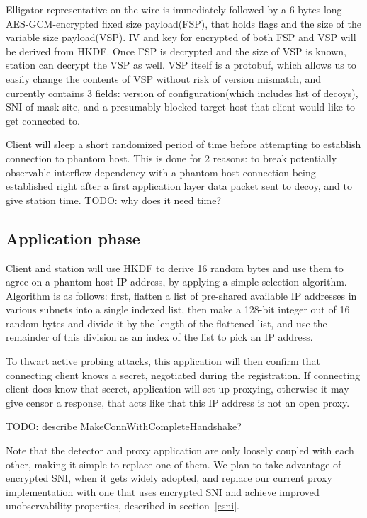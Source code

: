 \documentclass[sigconf,anonymous]{acmart}
\begin{document}
Elligator representative on the wire is immediately followed by a 6 bytes long AES-GCM-encrypted
fixed size payload(FSP), that holds flags and the size of the variable size payload(VSP).
IV and key for encrypted of both FSP and VSP will be derived from HKDF.
Once FSP is decrypted and the size of VSP is known, station can decrypt the VSP as well.
VSP itself is a protobuf, which allows us to easily change the contents of VSP without risk of version mismatch, and currently contains 3 fields: version of configuration(which includes list of decoys), SNI of mask site, and a presumably blocked target host that client would like to get connected to.

Client will sleep a short randomized period of time before attempting to establish connection to phantom host.
This is done for 2 reasons: to break potentially observable interflow dependency with a phantom host connection being established right after a first application layer data packet sent to decoy,
and to give station time.
TODO: why does it need time?

\subsection{Application phase}
Client and station will use HKDF to derive 16 random bytes and use them to
agree on a phantom host IP address, by applying a simple selection algorithm.
Algorithm is as follows: first, flatten a list of pre-shared available IP
addresses in various subnets into a single indexed list, then make a 128-bit
integer out of 16 random bytes and divide it by the length
of the flattened list, and use the remainder of this division as an index
of the list to pick an IP address.

To thwart active probing attacks, this application will then confirm
that connecting client knows a secret, negotiated during the registration.
If connecting client does know that secret, application will set up proxying,
otherwise it may give censor a response, that acts like that this IP address
is not an open proxy.

TODO: describe MakeConnWithCompleteHandshake?

Note that the detector and proxy application are only loosely coupled with each other,
making it simple to replace one of them.
We plan to take advantage of encrypted SNI, when it gets widely adopted,
and replace our current proxy implementation with one that uses encrypted SNI
and achieve improved unobservability properties, described in section~\ref{esni}.
\end{document}
